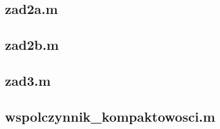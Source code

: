 


\subsection*{zad2a.m                       } \newpage
\subsection*{zad2b.m                       } \newpage
\subsection*{zad3.m                        } \newpage
\subsection*{wspolczynnik\_kompaktowosci.m } \newpage
